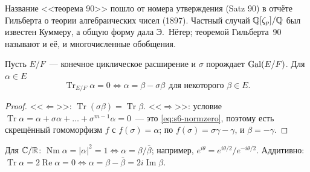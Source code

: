 Название <<теорема 90>> пошло от номера утверждения (Satz 90) в отчёте Гильберта о теории алгебраических чисел (1897).
Частный случай $\mathbb Q[\zeta_p]/\mathbb Q$ был известен Куммеру, а общую форму  дала Э.~Нётер; теоремой Гильберта~90
называют и её, и многочисленные обобщения.

\begin{corollary}
Пусть $E/F$~--- конечное циклическое расширение и $\sigma$ порождает $\operatorname{Gal}(E/F)$. Для $\alpha\in E$
\[
\operatorname{Tr}_{E/F}\alpha=0\iff\alpha=\beta-\sigma\beta\ \ \text{для некоторого }\beta\in E.
\]
\end{corollary}

\begin{proof}
<<$\Leftarrow$>>: $\operatorname{Tr}(\sigma\beta)=\operatorname{Tr}\beta$. <<$\Rightarrow$>>: условие $\operatorname{Tr}\alpha=\alpha+\sigma\alpha+\dots+\sigma^{m-1}\alpha=0$~---
это \eqref{eq:s6-normzero}, поэтому есть скрещённый гомоморфизм $f$ с $f(\sigma)=\alpha$; по 
$f(\sigma)=\sigma\gamma-\gamma$, и $\beta=-\gamma$.
\end{proof}

\begin{example}[5.25b]
Для $\mathbb C/\mathbb R$: $\operatorname{Nm}\alpha=|\alpha|^2=1\iff\alpha=\beta/\bar\beta$; например, $e^{i\theta}=e^{i\theta/2}/e^{-i\theta/2}$.
Аддитивно: $\operatorname{Tr}\alpha=2\operatorname{Re}\alpha=0\iff\alpha=\beta-\bar\beta=2i\operatorname{Im}\beta$.
\end{example}

